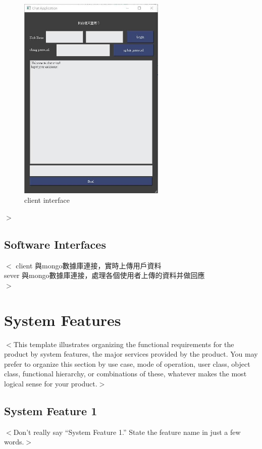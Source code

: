 \documentclass{scrreprt}
\begin{document}
\begin{CJK}{UTF8}{bkai}
\begin{figure}[h]
\begin{center}
\includegraphics[width=7cm]{interface1.jpg}
\end{center}
\caption{client interface}
\label{fig:3}
\end{figure}
$>$



\section{Software Interfaces}
$<$
	client 與mongo數據庫連接，實時上傳用戶資料\\
	sever  與mongo數據庫連接，處理各個使用者上傳的資料并做回應\\
$>$




\chapter{System Features}
$<$This template illustrates organizing the functional requirements for the 
product by system features, the major services provided by the product. You may 
prefer to organize this section by use case, mode of operation, user class, 
object class, functional hierarchy, or combinations of these, whatever makes the 
most logical sense for your product.$>$

\section{System Feature 1}
$<$Don’t really say “System Feature 1.” State the feature name in just a few 
words.$>$


\end{CJK}
\end{document}
